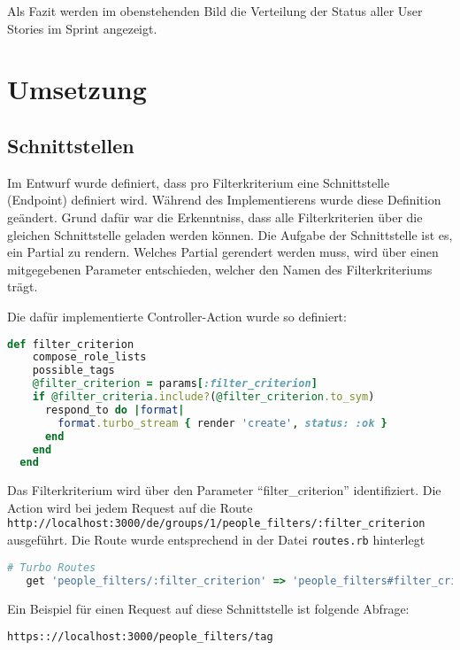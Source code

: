 Als Fazit werden im obenstehenden Bild die Verteilung der Status aller User Stories im Sprint angezeigt.

\newpage

\chapter{Umsetzung}

\section{Schnittstellen}
Im Entwurf wurde definiert, dass pro Filterkriterium eine Schnittstelle (Endpoint) definiert wird. Während des Implementierens wurde diese Definition geändert.
Grund dafür war die Erkenntniss, dass alle Filterkriterien über die gleichen Schnittstelle geladen werden können. Die Aufgabe der Schnittstelle ist es, 
ein Partial zu rendern. Welches Partial gerendert werden muss, wird über einen mitgegebenen Parameter entschieden, welcher den Namen des Filterkriteriums trägt.

Die dafür implementierte Controller-Action wurde so definiert:
\newline

\begin{lstlisting}[language=Ruby]
   def filter_criterion
    compose_role_lists
    possible_tags
    @filter_criterion = params[:filter_criterion]
    if @filter_criteria.include?(@filter_criterion.to_sym)
      respond_to do |format|
        format.turbo_stream { render 'create', status: :ok }
      end
    end
  end
\end{lstlisting}

Das Filterkriterium wird über den Parameter ``filter\_criterion'' identifiziert. Die Action wird bei jedem Request auf die Route 
\texttt{http://localhost:3000/de/groups/1/people\_filters/:filter\_criterion} ausgeführt. Die Route wurde entsprechend in der Datei
\texttt{routes.rb} hinterlegt
\newline

\begin{lstlisting}[language=Ruby]
   # Turbo Routes
   get 'people_filters/:filter_criterion' => 'people_filters#filter_criterion'
\end{lstlisting}

\newpage

Ein Beispiel für einen Request auf diese Schnittstelle ist folgende Abfrage: 

\texttt{https:://localhost:3000/people\_filters/tag} 


